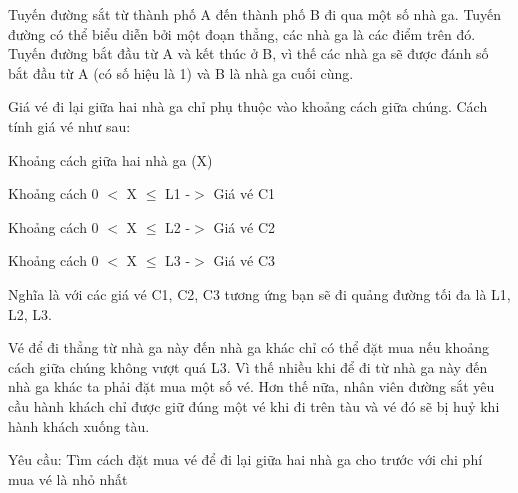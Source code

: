 Tuyến đường sắt từ thành phố A đến thành phố B đi qua một số nhà ga. Tuyến đường có thể biểu diễn bởi một đoạn thẳng, các nhà ga là các điểm trên đó. Tuyến đường bắt đầu từ A và kết thúc ở B, vì thế các nhà ga sẽ được đánh số bắt đầu từ A (có số hiệu là 1) và B là nhà ga cuối cùng.  

   Giá vé đi lại giữa hai nhà ga chỉ phụ thuộc vào khoảng cách giữa chúng. Cách tính giá vé như sau:  

   Khoảng cách giữa hai nhà ga (X)  

   Khoảng cách 0 $<$ X  $\le$  L1      -$>$ Giá vé              C1  

   Khoảng cách 0 $<$ X  $\le$  L2     -$>$ Giá vé              C2  

   Khoảng cách 0 $<$ X  $\le$  L3     -$>$ Giá vé              C3  

   Nghĩa là với các giá vé C1, C2, C3 tương ứng bạn sẽ đi quảng đường tối đa là L1, L2, L3.  

   Vé để đi thẳng từ nhà ga này đến nhà ga khác chỉ có thể đặt mua nếu khoảng cách giữa chúng không vượt quá L3. Vì thế nhiều khi để đi từ nhà ga này đến nhà ga khác ta phải đặt mua một số vé. Hơn thế nữa, nhân viên đường sắt yêu cầu hành khách chỉ được giữ đúng một vé khi đi trên tàu và vé đó sẽ bị huỷ khi hành khách xuống tàu.  

   Yêu cầu: Tìm cách đặt mua vé để đi lại giữa hai nhà ga cho trước với chi phí mua vé là nhỏ nhất  

\